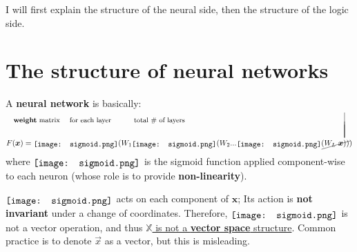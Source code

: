 \documentclass[orivec]{llncs}
\newcommand{\vect}[1]{\boldsymbol{#1}}
\newcommand*\sigmoid{\raisebox{-.2\height}{\texttt{[image: sigmoid.png]}}}
\newcommand{\tikzmark}[1]{\tikz[overlay,remember picture] \node (#1) {};}
\begin{document}
I will first explain the structure of the neural side, then the structure of the logic side.

\section{The structure of neural networks}

A \textbf{neural network} is basically:
\begin{eqnarray}
& \mbox{\footnotesize \textbf{weight} matrix } \tikzmark{weightMatrix} \mbox{\footnotesize for each layer} \quad \quad \mbox{\footnotesize total \# of layers} \tikzmark{numLayers} \nonumber \\
\nonumber \\
& F(\vect{x}) = \sigmoid(W_1 \tikzmark{wa} \sigmoid(W_2 \tikzmark{wb} ... \sigmoid( W_L \tikzmark{wc} \tikzmark{L} \; \vect{x} )))
\begin{tikzpicture}[overlay,remember picture]
  \draw[-, shorten <=17pt, transform canvas={shift={(-10pt,10pt)}}] (weightMatrix.center) to (wa.center);
  \draw[-, shorten <=21pt, transform canvas={shift={(-10pt,10pt)}}] (weightMatrix.center) to (wb.center);
  \draw[-, shorten <=33pt, transform canvas={shift={(-10pt,10pt)}}] (weightMatrix.center) to (wc.center);
  \draw (numLayers.center) +(-40pt,-5pt) -- ([shift={(-2pt,6pt)}]L.center);
\end{tikzpicture}
\end{eqnarray}
where $\sigmoid$ is the sigmoid function applied component-wise to each neuron (whose role is to provide \textbf{non-linearity}).

$\sigmoid$ acts on each component of $\vect{x}$;  Its action is \textbf{not invariant} under a change of coordinates.  Therefore, $\sigmoid$ is not a vector operation, and thus \uline{$\mathbb{X}$ is not a \textbf{vector space} structure}.  Common practice is to denote $\vec{x}$ as a vector, but this is misleading.
\end{document}
